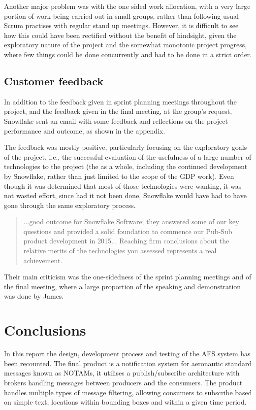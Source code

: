 \documentclass[a4paper, 12pt, twoside]{article}
\begin{document}
Another major problem was with the one sided work allocation, with a very large portion of work being carried out in small groups, rather than following usual Scrum practises with regular stand up meetings. However, it is difficult to see how this could have been rectified without the benefit of hindsight, given the exploratory nature of the project and the somewhat monotonic project progress, where few things could be done concurrently and had to be done in a strict order.

\subsection{Customer feedback}
\label{sec:eval_customer_feedback}

In addition to the feedback given in sprint planning meetings throughout the project, and the feedback given in the final meeting, at the group's request, Snowflake sent an email with some feedback and reflections on the project performance and outcome, as shown in the appendix.

The feedback was mostly positive, particularly focusing on the exploratory goals of the project, i.e., the successful evaluation of the usefulness of a large number of technologies to the project (the as a whole, including the continued development by Snowflake, rather than just limited to the scope of the GDP work). Even though it was determined that most of those technologies were wanting, it was not wasted effort, since had it not been done, Snowflake would have had to have gone through the same exploratory process.

\blockquote{...good outcome for Snowflake Software; they answered some of our key questions and provided a solid foundation to commence our Pub-Sub product development in 2015... Reaching firm conclusions about the relative merits of the technologies you assessed represents a real achievement.}

Their main criticism was the one-sidedness of the sprint planning meetings and of the final meeting, where a large proportion of the speaking and demonstration was done by James.

\section{Conclusions}
\label{sec:conclusions}

In this report the design, development process and testing of the AES system has been recounted. The final product is a notification system for aeronautic standard messages known as NOTAMs, it utilises a publish/subscribe architecture with brokers handling messages between producers and the consumers. The product handles multiple types of message filtering, allowing consumers to subscribe based on simple text, locations within bounding boxes and within a given time period.
\end{document}
